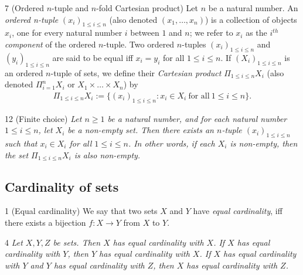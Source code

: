 \begin{definition}{7}
    \label{n-tuple}
    (Ordered $n$-tuple and $n$-fold Cartesian product) Let $n$ be a natural number. An \emph{ordered n-tuple}
    $(x_i)_{1\leq i \leq n}$ (also denoted $(x_1, \dots, x_n)$) is a collection of objects $x_i$, one for every natural
    number $i$ between $1$ and $n$; we refer to $x_i$ as the \emph{$i^{th}$ component} of the ordered $n$-tuple. Two
    ordered $n$-tuples $(x_i)_{1\leq i \leq n}$ and $(y_i)_{1\leq i \leq n}$ are said to be equal iff $x_i = y_i$ for
    all $1\leq i\leq n$. If $(X_i)_{1\leq i\leq n}$ is an ordered $n$-tuple of sets, we define their \emph{Cartesian
    product} $\Pi _{1\leq i\leq n} X_i$ (also denoted $\Pi _{i=1} ^{n} X_i$ or $X_1 \times \dots \times X_n$) by
    \begin{align*}
        \Pi _{1\leq i\leq n} X_i := \{(x_i)_{1\leq i\leq n}:x_i\in X_i~\text{for all}~1\leq i\leq n\}.
    \end{align*}
\end{definition}

\begin{lemma}{12}
    \label{finite-choice}
    (Finite choice) \emph{Let $n\geq 1$ be a natural number, and for each natural number $1\leq i\leq n$, let $X_i$ be
    a non-empty set. Then there exists an $n$-tuple $(x_i)_{1\leq i\leq n}$ such that $x_i\in X_i$ for all
    $1\leq i\leq n$. In other words, if each $X_i$ is non-empty, then the set $\Pi _{1\leq i\leq n} X_i$ is also
    non-empty.}
\end{lemma}


\subsection{Cardinality of sets}
\begin{definition}{1}
    \label{equal-cardinality}
    (Equal cardinality) We say that two sets $X$ and $Y$ have \emph{equal cardinality}, iff there exists a
    bijection $f: X\rightarrow Y$ from $X$ to $Y$.
\end{definition}

\begin{proposition}{4}
    \label{equal-card-equivalence}
    \emph{Let $X, Y, Z$ be sets. Then $X$ has equal cardinality with $X$. If $X$ has equal cardinality with $Y$, then $Y$
    has equal cardinality with $X$. If $X$ has equal cardinality with $Y$ and $Y$ has equal cardinality with $Z$, then
    $X$ has equal cardinality with $Z$.}
\end{proposition}

